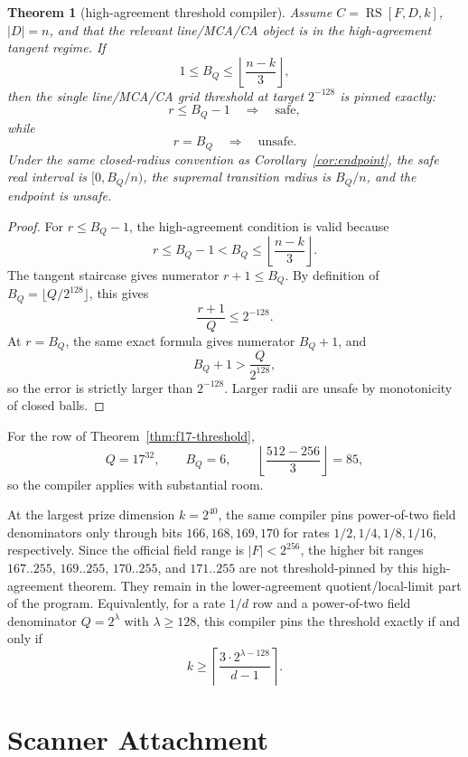 \documentclass[11pt]{article}
\newtheorem{theorem}{Theorem}
\theoremstyle{remark}
\newcommand{\RS}{\operatorname{RS}}
\begin{document}
\begin{theorem}[high-agreement threshold compiler]
\label{thm:compiler}
Assume \(C=\RS[F,D,k]\), \(|D|=n\), and that the relevant line/MCA/CA object is
in the high-agreement tangent regime.  If
\[
  1\le B_Q\le \left\lfloor\frac{n-k}{3}\right\rfloor,
\]
then the single line/MCA/CA grid threshold at target \(2^{-128}\) is pinned
exactly:
\[
  r\le B_Q-1 \quad\Longrightarrow\quad \text{safe},
\]
while
\[
  r=B_Q \quad\Longrightarrow\quad \text{unsafe}.
\]
Under the same closed-radius convention as Corollary~\ref{cor:endpoint}, the
safe real interval is \([0,B_Q/n)\), the supremal transition radius is \(B_Q/n\),
and the endpoint is unsafe.
\end{theorem}

\begin{proof}
For \(r\le B_Q-1\), the high-agreement condition is valid because
\[
  r\le B_Q-1< B_Q\le\left\lfloor\frac{n-k}{3}\right\rfloor.
\]
The tangent staircase gives numerator \(r+1\le B_Q\).  By definition of
\(B_Q=\lfloor Q/2^{128}\rfloor\), this gives
\[
  \frac{r+1}{Q}\le 2^{-128}.
\]
At \(r=B_Q\), the same exact formula gives numerator \(B_Q+1\), and
\[
  B_Q+1>\frac{Q}{2^{128}},
\]
so the error is strictly larger than \(2^{-128}\).  Larger radii are unsafe by
monotonicity of closed balls.
\end{proof}

For the row of Theorem~\ref{thm:f17-threshold},
\[
  Q=17^{32},\qquad B_Q=6,\qquad
  \left\lfloor\frac{512-256}{3}\right\rfloor=85,
\]
so the compiler applies with substantial room.

At the largest prize dimension \(k=2^{40}\), the same compiler pins
power-of-two field denominators only through bits \(166,168,169,170\) for rates
\(1/2,1/4,1/8,1/16\), respectively.  Since the official field range is
\(|F|<2^{256}\), the higher bit ranges \(167..255\), \(169..255\), \(170..255\),
and \(171..255\) are not threshold-pinned by this high-agreement theorem.  They
remain in the lower-agreement quotient/local-limit part of the program.
Equivalently, for a rate \(1/d\) row and a power-of-two field denominator
\(Q=2^\lambda\) with \(\lambda\ge128\), this compiler pins the threshold exactly
if and only if
\[
  k\ge
  \left\lceil \frac{3\cdot 2^{\lambda-128}}{d-1}\right\rceil .
\]

\section{Scanner Attachment}
\label{sec:scanner}
\end{document}
